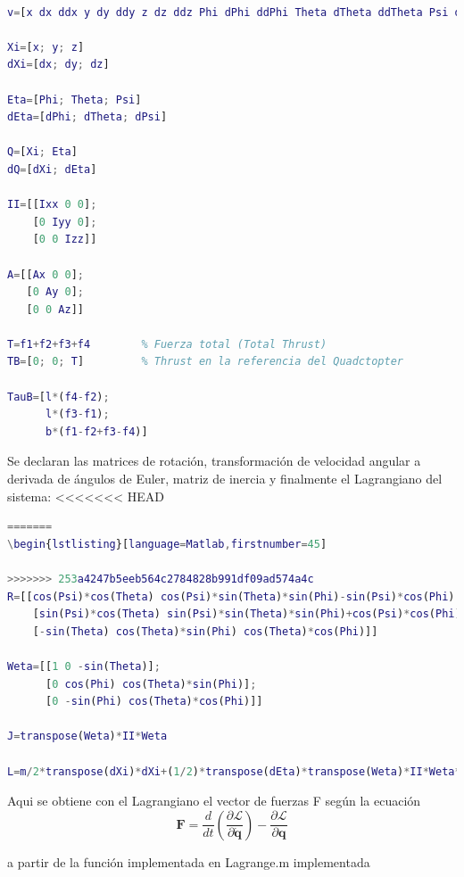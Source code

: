 \documentclass[twoside,11pt]{report}
\begin{document}
\begin{lstlisting}[language=Matlab,firstnumber=18]
% El vector de variables que se usaran

v=[x dx ddx y dy ddy z dz ddz Phi dPhi ddPhi Theta dTheta ddTheta Psi dPsi ddPsi]

Xi=[x; y; z]
dXi=[dx; dy; dz]

Eta=[Phi; Theta; Psi]
dEta=[dPhi; dTheta; dPsi]

Q=[Xi; Eta]
dQ=[dXi; dEta]

II=[[Ixx 0 0];
    [0 Iyy 0];
    [0 0 Izz]]

A=[[Ax 0 0];
   [0 Ay 0];
   [0 0 Az]]   
   
T=f1+f2+f3+f4        % Fuerza total (Total Thrust)
TB=[0; 0; T]         % Thrust en la referencia del Quadctopter

TauB=[l*(f4-f2);
      l*(f3-f1);
      b*(f1-f2+f3-f4)]   
\end{lstlisting}
\onehalfspacing
Se declaran las matrices de rotación, transformación de velocidad angular a derivada de ángulos de Euler, matriz de inercia y finalmente el Lagrangiano del sistema:
\singlespacing
<<<<<<< HEAD
\begin{lstlisting}[language=Matlab,firstnumber=45]
=======
\begin{lstlisting}[language=Matlab,firstnumber=45]   
   
>>>>>>> 253a4247b5eeb564c2784828b991df09ad574a4c
R=[[cos(Psi)*cos(Theta) cos(Psi)*sin(Theta)*sin(Phi)-sin(Psi)*cos(Phi) cos(Psi)*sin(Theta)*cos(Phi)+sin(Psi)*sin(Phi)];
    [sin(Psi)*cos(Theta) sin(Psi)*sin(Theta)*sin(Phi)+cos(Psi)*cos(Phi) sin(Psi)*sin(Theta)*cos(Phi)-cos(Psi)*sin(Phi)];
    [-sin(Theta) cos(Theta)*sin(Phi) cos(Theta)*cos(Phi)]]

Weta=[[1 0 -sin(Theta)];
      [0 cos(Phi) cos(Theta)*sin(Phi)];
      [0 -sin(Phi) cos(Theta)*cos(Phi)]]
  
J=transpose(Weta)*II*Weta  
  
L=m/2*transpose(dXi)*dXi+(1/2)*transpose(dEta)*transpose(Weta)*II*Weta*dEta-m*g*z
\end{lstlisting}
\onehalfspacing
Aqui se obtiene con el Lagrangiano el vector de fuerzas F según la ecuación 
\begin{equation}
\mathbf{F}=\frac{d}{dt}\left( \frac{\partial \mathcal{L}}{\partial \dot{\pmb{q}}} \right) - \frac{\partial \mathcal{L}}{\partial \pmb{q}}
\end{equation}

a partir de la función implementada en Lagrange.m implementada \cite{Lagrangian_Matlab} \\
\end{document}
